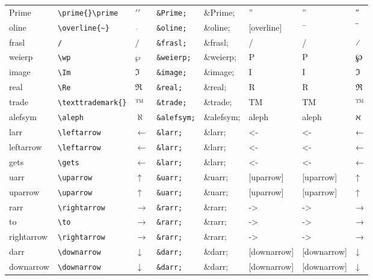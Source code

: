 \documentclass[11pt]{article}
\begin{document}
\begin{longtable}{llllllll}
Prime & \texttt{\textbackslash{}prime\{\}\textbackslash{}prime} & $\prime{}\prime$ & \texttt{\&Prime;} & \&Prime; & '' & '' & ″\\
oline & \texttt{\textbackslash{}overline\{\textasciitilde{}\}} & $\overline{~}$ & \texttt{\&oline;} & \&oline; & [overline] & ¯ & ‾\\
frasl & \texttt{/} & $\mbox{/}$ & \texttt{\&frasl;} & \&frasl; & / & / & ⁄\\
weierp & \texttt{\textbackslash{}wp} & $\wp$ & \texttt{\&weierp;} & \&weierp; & P & P & ℘\\
image & \texttt{\textbackslash{}Im} & $\Im$ & \texttt{\&image;} & \&image; & I & I & ℑ\\
real & \texttt{\textbackslash{}Re} & $\Re$ & \texttt{\&real;} & \&real; & R & R & ℜ\\
trade & \texttt{\textbackslash{}texttrademark\{\}} & $\mbox{\texttrademark{}}$ & \texttt{\&trade;} & \&trade; & TM & TM & ™\\
alefsym & \texttt{\textbackslash{}aleph} & $\aleph$ & \texttt{\&alefsym;} & \&alefsym; & aleph & aleph & ℵ\\
larr & \texttt{\textbackslash{}leftarrow} & $\leftarrow$ & \texttt{\&larr;} & \&larr; & <- & <- & ←\\
leftarrow & \texttt{\textbackslash{}leftarrow} & $\leftarrow$ & \texttt{\&larr;} & \&larr; & <- & <- & ←\\
gets & \texttt{\textbackslash{}gets} & $\gets$ & \texttt{\&larr;} & \&larr; & <- & <- & ←\\
uarr & \texttt{\textbackslash{}uparrow} & $\uparrow$ & \texttt{\&uarr;} & \&uarr; & [uparrow] & [uparrow] & ↑\\
uparrow & \texttt{\textbackslash{}uparrow} & $\uparrow$ & \texttt{\&uarr;} & \&uarr; & [uparrow] & [uparrow] & ↑\\
rarr & \texttt{\textbackslash{}rightarrow} & $\rightarrow$ & \texttt{\&rarr;} & \&rarr; & -> & -> & →\\
to & \texttt{\textbackslash{}to} & $\to$ & \texttt{\&rarr;} & \&rarr; & -> & -> & →\\
rightarrow & \texttt{\textbackslash{}rightarrow} & $\rightarrow$ & \texttt{\&rarr;} & \&rarr; & -> & -> & →\\
darr & \texttt{\textbackslash{}downarrow} & $\downarrow$ & \texttt{\&darr;} & \&darr; & [downarrow] & [downarrow] & ↓\\
downarrow & \texttt{\textbackslash{}downarrow} & $\downarrow$ & \texttt{\&darr;} & \&darr; & [downarrow] & [downarrow] & ↓\\

\end{longtable}
\end{document}
